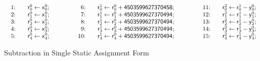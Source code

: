 \begin{figure}
  \centering
  \[
  \begin{array}{lclcl}
    \begin{array}{rcl}
    \textmd{1:} && \dslcode{r}^0_0 \leftarrow \dslcode{x}^0_0; \\
    \textmd{2:} && \dslcode{r}^0_1 \leftarrow \dslcode{x}^0_1; \\
    \textmd{3:} && \dslcode{r}^0_2 \leftarrow \dslcode{x}^0_2; \\
    \textmd{4:} && \dslcode{r}^0_3 \leftarrow \dslcode{x}^0_3; \\
    \textmd{5:} && \dslcode{r}^0_4 \leftarrow \dslcode{x}^0_4; \\
    \end{array}
    &\hspace{.05\textwidth}&
    \begin{array}{rcl}
    \textmd{6:} && 
      \dslcode{r}^1_0 \leftarrow \dslcode{r}^0_0 + \dslcode{4503599627370458}; \\
    \textmd{7:} &&
      \dslcode{r}^1_1 \leftarrow \dslcode{r}^0_1 + \dslcode{4503599627370494}; \\
    \textmd{8:} &&
      \dslcode{r}^1_2 \leftarrow \dslcode{r}^0_2 + \dslcode{4503599627370494}; \\
    \textmd{9:} &&
      \dslcode{r}^1_3 \leftarrow \dslcode{r}^0_3 + \dslcode{4503599627370494}; \\
    \textmd{10:} && 
      \dslcode{r}^1_4 \leftarrow \dslcode{r}^0_4 + \dslcode{4503599627370494};\\
    \end{array}
    &\hspace{.05\textwidth}&
    \begin{array}{rcl}
    \textmd{11:} && \dslcode{r}^2_0 \leftarrow \dslcode{r}^1_0 - \dslcode{y}^0_0; \\
    \textmd{12:} && \dslcode{r}^2_1 \leftarrow \dslcode{r}^1_1 - \dslcode{y}^0_1; \\
    \textmd{13:} && \dslcode{r}^2_2 \leftarrow \dslcode{r}^1_2 - \dslcode{y}^0_2; \\
    \textmd{14:} && \dslcode{r}^2_3 \leftarrow \dslcode{r}^1_3 - \dslcode{y}^0_3; \\
    \textmd{15:} && \dslcode{r}^2_4 \leftarrow \dslcode{r}^1_4 - \dslcode{y}^0_4;
    \end{array}
  \end{array}
  \]
  \caption{Subtraction  in Single Static Assignment Form}
  \label{figure:dsl:subtraction-ssa}
\end{figure}

